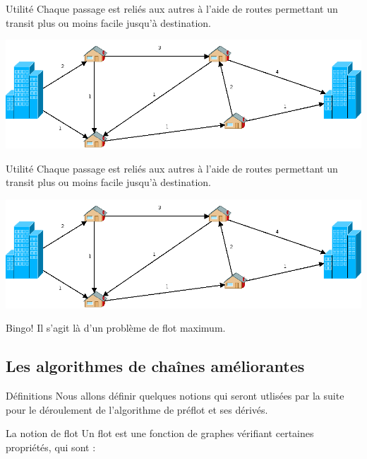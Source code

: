 \begin{frame}{Utilité}
	Chaque passage est reliés aux autres à l'aide de routes permettant un transit plus ou moins facile
	jusqu'à destination.

	\begin{center}
		\includegraphics[scale=0.32]{img/exemple.png}
	\end{center}
\end{frame}

\begin{frame}{Utilité}
	Chaque passage est reliés aux autres à l'aide de routes permettant un transit plus ou moins facile
	jusqu'à destination.

	\begin{center}
		\includegraphics[scale=0.32]{img/exemple.png}
	\end{center}

	\begin{alertblock}{Bingo!}
		Il s'agit là d'un problème de flot maximum.
	\end{alertblock}
\end{frame}

\subsection{Les algorithmes de chaînes améliorantes}
\begin{frame}{Définitions}
		Nous allons définir quelques notions qui seront utlisées par la suite
		pour le déroulement de l'algorithme de préflot et ses dérivés.
\end{frame}

\begin{frame}{La notion de flot}
	Un flot est une fonction de graphes vérifiant certaines propriétés, qui sont : \vfill \vfill
\end{frame} 

